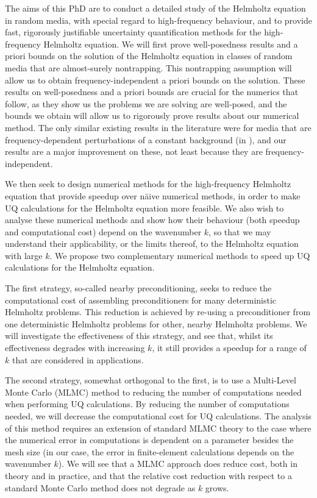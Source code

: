 The aims of this PhD are to conduct a detailed study of the Helmholtz equation in random media, with special regard to high-frequency behaviour, and to provide fast, rigorously justifiable uncertainty quantification methods for the high-frequency Helmholtz equation. We will first prove well-posedness results and a priori bounds on the solution of the Helmholtz equation in classes of random media that are almost-surely nontrapping. This nontrapping assumption will allow us to obtain frequency-independent a priori bounds on the solution. These results on well-posedness and a priori bounds are crucial for the numerics that follow, as they show us the problems we are solving are well-posed, and the bounds we obtain will allow us to rigorously prove results about our numerical method. The only similar existing results in the literature were for media that are frequency-dependent perturbations of a constant background (in \cite{FeLiLo:15}), and our results are a major improvement on these, not least because they are frequency-independent.

We then seek to design numerical methods for the high-frequency Helmholtz equation that provide speedup over n\"aive numerical methods, in order to make UQ calculations for the Helmholtz equation more feasible. We also wish to analyse these numerical methods and show how their behaviour (both speedup and computational cost) depend on the wavenumber $k$, so that we may understand their applicability, or the limits thereof, to the Helmholtz equation with large $k$. We propose two complementary numerical methods to speed up UQ calculations for the Helmholtz equation.

The first strategy, so-called nearby preconditioning, seeks to reduce the computational cost of assembling preconditioners for many deterministic Helmholtz problems. This reduction is achieved by re-using a preconditioner from one deterministic Helmholtz problems for other, nearby Helmholtz problems. We will investigate the effectiveness of this strategy, and see that, whilst its effectiveness degrades with increasing $k$, it still provides a speedup for a range of $k$ that are considered in applications.

The second strategy, somewhat orthogonal to the first, is to use a Multi-Level Monte Carlo (MLMC) method to reducing the number of computations needed when performing UQ calculations. By reducing the number of computations needed, we will decrease the computational cost for UQ calculations. The analysis of this method requires an extension of standard MLMC theory to the case where the numerical error in computations is dependent on a parameter besides the mesh size (in our case, the error in finite-element calculations depends on the wavenumber $k$). We will see that a MLMC approach does reduce cost, both in theory and in practice, and that the relative cost reduction with respect to a standard Monte Carlo method does not degrade as $k$ grows.


